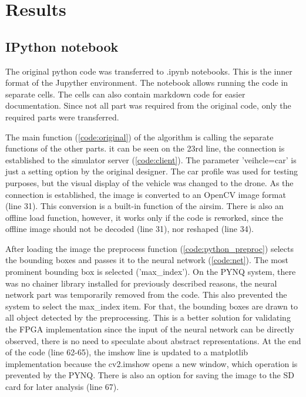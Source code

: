 \chapter{Results} \label{ch:results} %

\section{IPython notebook} %
The original python code was transferred to .ipynb notebooks.
This is the inner format of the Jupyther environment.
The notebook allows running the code in separate cells.
The cells can also contain markdown code for easier documentation.
Since not all part was required from the original code, only the required parts were transferred.

The main function (\cref{code:original}) of the algorithm is calling the separate functions of the other parts.
it can be seen on the 23rd line, the connection is established to the simulator server (\cref{code:client}).
The parameter 'veihcle=car' is just a setting option by the original designer.
The car profile was used for testing purposes, but the visual display of the vehicle was changed to the drone.
As the connection is established, the image is converted to an OpenCV image format (line 31).
This conversion is a built-in function of the airsim.
There is also an offline load function, however, it works only if the code is reworked, since the offline image should not be decoded (line 31), nor reshaped (line 34).

After loading the image the preprocess function (\cref{code:python_preproc}) selects the bounding boxes and passes it to the neural network (\cref{code:net}).
The most prominent bounding box is selected ('max\_index').
On the PYNQ system, there was no chainer library installed for previously described reasons, the neural network part was temporarily removed from the code.
This also prevented the system to select the max\_index item.
For that, the bounding boxes are drawn to all object detected by the preprocessing.
This is a better solution for validating the FPGA implementation since the input of the neural network can be directly observed, there is no need to speculate about abstract representations.
At the end of the code (line 62-65), the imshow line is updated to a matplotlib implementation because the cv2.imshow opens a new window, which operation is prevented by the PYNQ.
There is also an option for saving the image to the SD card for later analysis (line 67).

